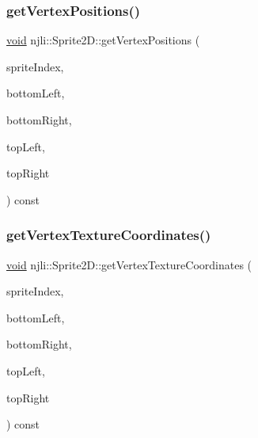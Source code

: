 \subsubsection{\texorpdfstring{get\+Vertex\+Positions()}{getVertexPositions()}}
{\footnotesize\ttfamily \mbox{\hyperlink{_thread_8h_af1e856da2e658414cb2456cb6f7ebc66}{void}} njli\+::\+Sprite2\+D\+::get\+Vertex\+Positions (\begin{DoxyParamCaption}\item[{const \mbox{\hyperlink{_util_8h_ad758b7a5c3f18ed79d2fcd23d9f16357}{u64}}}]{sprite\+Index,  }\item[{bt\+Vector2 \&}]{bottom\+Left,  }\item[{bt\+Vector2 \&}]{bottom\+Right,  }\item[{bt\+Vector2 \&}]{top\+Left,  }\item[{bt\+Vector2 \&}]{top\+Right }\end{DoxyParamCaption}) const\hspace{0.3cm}{\ttfamily [protected]}}

\mbox{\label{classnjli_1_1_sprite2_d_aa4ffca63ade5288e0426e70c67035f00}} 
\subsubsection{\texorpdfstring{get\+Vertex\+Texture\+Coordinates()}{getVertexTextureCoordinates()}}
{\footnotesize\ttfamily \mbox{\hyperlink{_thread_8h_af1e856da2e658414cb2456cb6f7ebc66}{void}} njli\+::\+Sprite2\+D\+::get\+Vertex\+Texture\+Coordinates (\begin{DoxyParamCaption}\item[{const \mbox{\hyperlink{_util_8h_ad758b7a5c3f18ed79d2fcd23d9f16357}{u64}}}]{sprite\+Index,  }\item[{bt\+Vector2 \&}]{bottom\+Left,  }\item[{bt\+Vector2 \&}]{bottom\+Right,  }\item[{bt\+Vector2 \&}]{top\+Left,  }\item[{bt\+Vector2 \&}]{top\+Right }\end{DoxyParamCaption}) const\hspace{0.3cm}{\ttfamily [protected]}}

\mbox{\label{classnjli_1_1_sprite2_d_a5f7f2c09006d809bce2914d86e3350d6}} 
